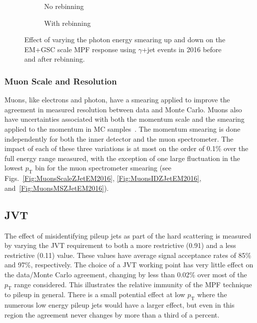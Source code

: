 \begin{figure}[!ht]
\centering
\begin{subfigure}{.5\textwidth}
\centering
{}
\caption{No rebinning}
\end{subfigure}%
\begin{subfigure}{.5\textwidth}  \centering
{}
\caption{With rebinning}
\end{subfigure}
\caption{Effect of varying the photon energy smearing up and down on the EM+GSC scale MPF response using $\gamma$+jet events in 2016 before and after rebinning. }
\label{Fig:EGResolutionGJetEM2016}
\end{figure}

\subsubsection{Muon Scale and Resolution}
Muons, like electrons and photon, have a smearing applied to improve the agreement in measured resolution between data and Monte Carlo.  
Muons also have uncertainties associated with both the momentum scale and the smearing applied to the momentum in MC samples~\cite{Aad:2016jkr}.  
The momentum smearing is done independently for both the inner detector and the muon spectrometer.  
The impact of each of these three variations is at most on the order of 0.1\% over the full energy range measured, with the exception of one large fluctuation in the lowest $p_{\mathrm T}$ bin for the muon spectrometer smearing (see Figs.~\ref{Fig:MuonsScaleZJetEM2016}, \ref{Fig:MuonsIDZJetEM2016}, and~\ref{Fig:MuonsMSZJetEM2016}).  


\subsection{JVT}

The effect of misidentifying pileup jets as part of the hard scattering is measured by varying the JVT requirement to both a more restrictive (0.91) and a less restrictive (0.11) value.  
These values have average signal acceptance rates of 85\% and 97\%, respectively.  
The choice of a JVT working point has very little effect on the data/Monte Carlo agreement, changing by less than 0.02\% over most of the $p_{\mathrm T}$ range considered.  
This illustrates the relative immunity of the MPF technique to pileup in general.  
There is a small potential effect at low $p_{\mathrm T}$ where the numerous low energy pileup jets would have a larger effect, but even in this region the agreement never changes by more than a third of a percent.  


